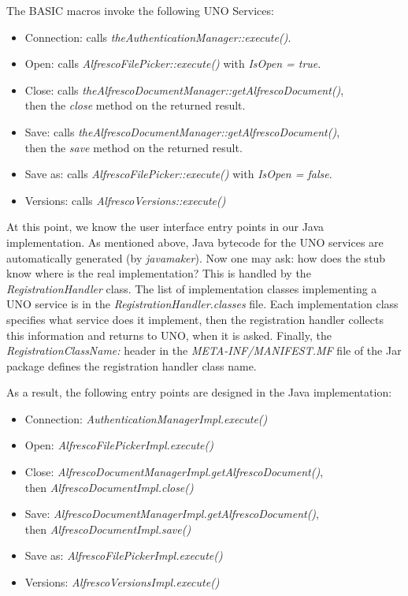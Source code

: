 The BASIC macros invoke the following UNO Services:

\begin{itemize}
\item Connection: calls \emph{theAuthenticationManager::execute()}.
\item Open: calls \emph{AlfrescoFilePicker::execute()} with \emph{IsOpen = true}.
\item Close: calls \emph{theAlfrescoDocumentManager::getAlfrescoDocument()}, \\ then the \emph{close} method on the returned result.
\item Save: calls \emph{theAlfrescoDocumentManager::getAlfrescoDocument()}, \\ then the \emph{save} method on the returned result.
\item Save as: calls \emph{AlfrescoFilePicker::execute()} with \emph{IsOpen = false}.
\item Versions: calls \emph{AlfrescoVersions::execute()}
\end{itemize}

At this point, we know the user interface entry points in our Java
implementation. As mentioned above, Java bytecode for the UNO services are
automatically generated (by \emph{javamaker}). Now one may ask: how does the
stub know where is the real implementation? This is handled by the
\emph{RegistrationHandler} class. The list of implementation classes
implementing a UNO service is in the \emph{RegistrationHandler.classes} file.
Each implementation class specifies what service does it implement, then the
registration handler collects this information and returns to UNO, when it is
asked. Finally, the \emph{RegistrationClassName:} header in the
\emph{META-INF/MANIFEST.MF} file of the Jar package defines the registration
handler class name.

As a result, the following entry points are designed in the Java
implementation:

\begin{itemize}
\item Connection: \emph{AuthenticationManagerImpl.execute()}
\item Open: \emph{AlfrescoFilePickerImpl.execute()}
\item Close: \emph{AlfrescoDocumentManagerImpl.getAlfrescoDocument()}, \\ then \emph{AlfrescoDocumentImpl.close()}
\item Save: \emph{AlfrescoDocumentManagerImpl.getAlfrescoDocument()}, \\ then \emph{AlfrescoDocumentImpl.save()}
\item Save as: \emph{AlfrescoFilePickerImpl.execute()}
\item Versions: \emph{AlfrescoVersionsImpl.execute()}
\end{itemize}

